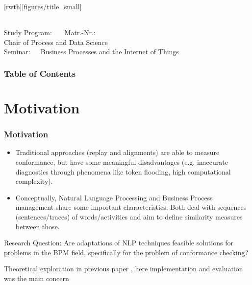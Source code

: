 \documentclass{beamer}
\author[\firstname]{\firstname~\lastname~\email}
\institute[RWTH]{RWTH Aachen University}
\begin{document}
	\beamertemplatenavigationsymbolsempty
[rwth][figures/title_small]{}
\begin{frame}[plain]
	\vspace{1cm}
	\titlepage
	
	\vspace{-6em}
	\parbox{0cm}{
		\begin{tabbing}
			\=\textbf{\firstname~\lastname}\=\\[0.4em]
			\=Study Program: \studyProgram~~~\=Matr.-Nr.:\matrNo\\[0.4em]
			\=Chair of Process and Data Science \=\\%
			\={Seminar:}~~~\=Business Processes and the Internet of Things\\
		\end{tabbing}
	}
\end{frame}
	\begin{frame}
		\frametitle{Table of Contents}
		\tableofcontents
	\end{frame}
	\section{Motivation}
	\begin{frame}
		\frametitle{Motivation}
		\begin{itemize}
			\item Traditional approaches (replay and alignments) are able to measure conformance, but have some meaningful disadvantages (e.g. inaccurate diagnostics through phenomena like token flooding, high computational complexity).
			\item Conceptually, Natural Language Processing and Business Process management share some important characteristics. Both deal with sequences (sentences/traces) of words/activities and aim to define similarity measures between those.
		\end{itemize}
		\begin{block}{Research Question:}
			Are adaptations of NLP techniques feasible solutions for problems in the BPM field, specifically for the problem of conformance checking?
		\end{block}
		\alert{Theoretical exploration in previous paper \cite{KBWe18}, here \cite{PBWe20} implementation and evaluation was the main concern}
	\end{frame}
\end{document}
